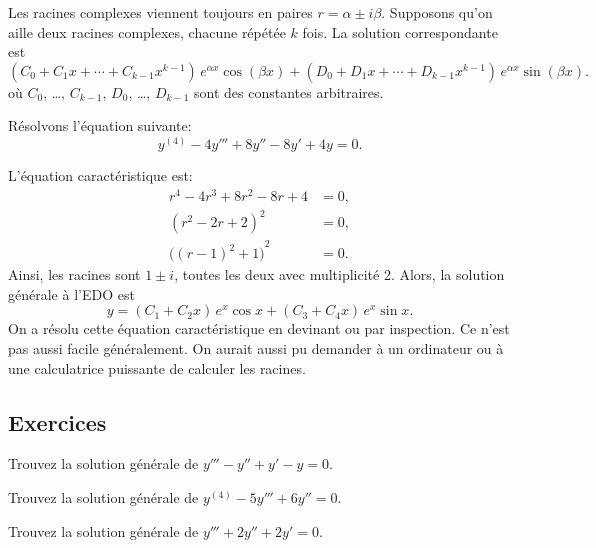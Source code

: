 Les racines complexes viennent toujours en paires 
$r = \alpha \pm i \beta$.  Supposons qu'on aille deux racines complexes, chacune répétée $k$ fois.
La solution correspondante est 
\begin{equation*}
( C_0 + C_1 x + \cdots + C_{k-1} x^{k-1} ) \, e^{\alpha x} \cos (\beta x)
+
( D_0 + D_1 x + \cdots + D_{k-1} x^{k-1} ) \, e^{\alpha x} \sin (\beta x) .
\end{equation*}
où $C_0$, \ldots, $C_{k-1}$, $D_0$, \ldots, $D_{k-1}$ sont des constantes arbitraires. 

\begin{example}
Résolvons l'équation suivante: 
\begin{equation*}
y^{(4)} - 4 y''' + 8 y'' - 8 y' + 4y = 0 .
\end{equation*}

L'équation caractéristique est: 
\begin{align*}
r^4 - 4 r^3 + 8 r^2 - 8 r + 4 & = 0 , \\
{(r^2-2r+2)}^2 & = 0 , \\
{\bigl({(r-1)}^2+1\bigr)}^2 & = 0 .
\end{align*}
Ainsi, les racines sont  $1 \pm i$, toutes les deux avec multiplicité 2. Alors, la solution générale à l'EDO est  
\begin{equation*}
y = 
( C_1 + C_2 x ) \, e^{x} \cos x
+
( C_3 + C_4 x ) \, e^{x} \sin x .
\end{equation*}
On a résolu cette équation caractéristique en devinant ou par inspection. Ce n'est pas aussi facile généralement. On aurait aussi pu demander à un ordinateur ou à une calculatrice puissante de calculer les racines. 
\end{example}


\subsection{Exercices}

\begin{exercise}
Trouvez la solution générale de $y''' - y'' + y' - y = 0$.
\end{exercise}

\begin{exercise}
Trouvez la solution générale de $y^{(4)} - 5 y''' + 6 y'' = 0$.
\end{exercise}

\begin{exercise}
Trouvez la solution générale de $y''' + 2 y'' + 2 y' = 0$.
\end{exercise}


